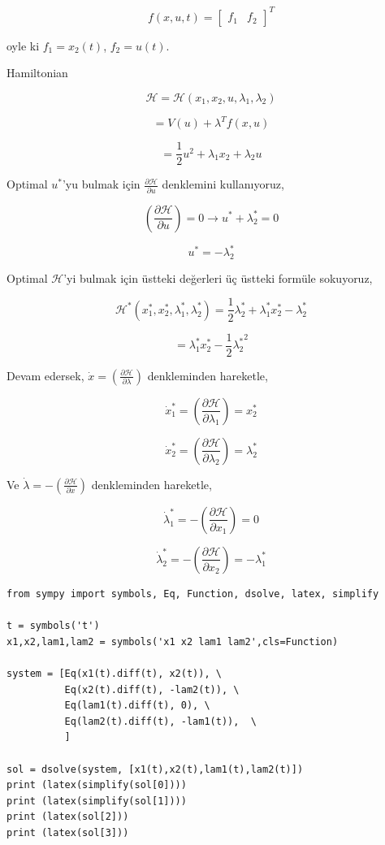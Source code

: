 \documentclass[12pt,fleqn]{article}\usepackage{../../common}
\begin{document}
$$
f(x,u,t) = \left[\begin{array}{cc} f_1 & f_2 \end{array}\right]^T
$$

oyle ki $f_1 = x_2(t)$, $f_2 = u(t)$. 

Hamiltonian

$$
\mathcal{H} = \mathcal{H}(x_1, x_2, u, \lambda_1, \lambda_2)
$$

$$
= V(u) + \lambda^T f(x,u)
$$

$$
= \frac{1}{2} u^2 + \lambda_1 x_2 + \lambda_2 u 
$$

Optimal $u^*$'yu bulmak için $\frac{\partial \mathcal{H}}{\partial u}$
denklemini kullanıyoruz,

$$
\left( \frac{\partial \mathcal{H}}{\partial u} \right) = 0 \to
u^* + \lambda_2^* = 0
$$

$$
u^* = -\lambda_2^*
$$

Optimal $\mathcal{H}$'yi bulmak için üstteki değerleri üç üstteki
formüle sokuyoruz, 

$$
\mathcal{H}^*(x_1^*, x_2^*,\lambda_1^*,\lambda_2^*) = 
\frac{1}{2} \lambda_2^* + \lambda_1^* x_2^* - \lambda_2^* 
$$

$$
= \lambda_1^* x_2^* - \frac{1}{2} {\lambda_2^*}^2  
$$

Devam edersek, $\dot{x} = \left( \frac{\partial \mathcal{H}}{\partial
\lambda} \right)$  denkleminden hareketle,

$$
\dot{x}^*_1 = \left( \frac{\partial \mathcal{H}}{\partial \lambda_1} \right) =
x_2^*
$$

$$
\dot{x}^*_2 = \left( \frac{\partial \mathcal{H}}{\partial \lambda_2} \right) =
\lambda_2^*
$$

Ve $\dot{\lambda} = - \left( \frac{\partial \mathcal{H}}{\partial x}
\right)$ denkleminden hareketle,

$$
\dot{\lambda}_1^* = - \left( \frac{\partial \mathcal{H}}{\partial x_1} \right) = 0
$$

$$
\dot{\lambda}_2^* = - \left( \frac{\partial \mathcal{H}}{\partial x_2} \right) = 
- \lambda_1^*
$$

\begin{verbatim}
from sympy import symbols, Eq, Function, dsolve, latex, simplify

t = symbols('t') 
x1,x2,lam1,lam2 = symbols('x1 x2 lam1 lam2',cls=Function)

system = [Eq(x1(t).diff(t), x2(t)), \
          Eq(x2(t).diff(t), -lam2(t)), \
          Eq(lam1(t).diff(t), 0), \
          Eq(lam2(t).diff(t), -lam1(t)),  \
          ]

sol = dsolve(system, [x1(t),x2(t),lam1(t),lam2(t)])
print (latex(simplify(sol[0])))
print (latex(simplify(sol[1])))
print (latex(sol[2]))
print (latex(sol[3]))
\end{verbatim}
\end{document}
